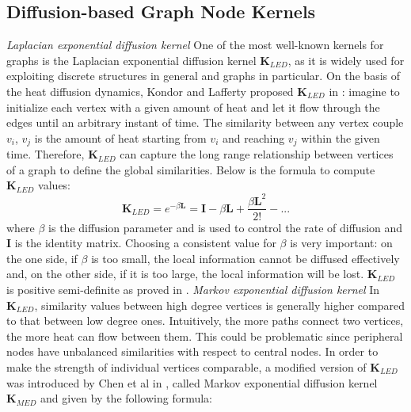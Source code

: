 \documentclass{article}
\begin{document}
\subsection{Diffusion-based Graph Node Kernels}
\textit{Laplacian exponential diffusion kernel} \newline
One of the most well-known kernels for graphs is the Laplacian exponential diffusion kernel $\textbf{K}_{LED}$, as it is widely used for exploiting discrete structures in general and graphs in particular. On the basis of the heat diffusion dynamics, Kondor and Lafferty proposed $\textbf{K}_{LED}$ in \cite{ledk}: imagine to initialize each vertex with a given amount of heat and let it flow through the edges until an arbitrary instant of time. The similarity between any vertex couple $v_{i}$, $v_{j}$ is the amount of heat starting from $v_{i}$ and reaching $v_{j}$ within the given time. Therefore, $\textbf{K}_{LED}$ can capture the long range relationship between vertices of a graph to define the global similarities. Below is the formula to compute $\textbf{K}_{LED}$ values:
\begin{equation} \label{LEDK-formula}
\textbf{K}_{LED} = e^{-\beta \textbf{L}} = \textbf{I} - \beta \textbf{L} + \frac{\beta \textbf{L}^{2}}{2!} - ...
\end{equation}
where $\beta$ is the diffusion parameter and is used to control the rate of diffusion and $\textbf{I}$ is the identity matrix. Choosing a consistent value for $\beta$ is very important: on the one side, if $\beta$ is too small, the local information cannot be diffused effectively and, on the other side, if it is too large, the local information will be lost. $\textbf{K}_{LED}$ is positive semi-definite as proved in \cite{ledk}. \newline \newline
\textit{Markov exponential diffusion kernel} \newline
In $\textbf{K}_{LED}$, similarity values between high degree vertices is generally higher compared to that between low degree ones. Intuitively, the more paths connect two vertices, the more heat can flow between them. This could be problematic since peripheral nodes have unbalanced similarities with respect to central nodes. In order to make the strength of individual vertices comparable, a modified version of $\textbf{K}_{LED}$ was introduced by Chen et al in \cite{mrf}, called Markov exponential diffusion kernel $\textbf{K}_{MED}$ and given by the following formula:
\end{document}
